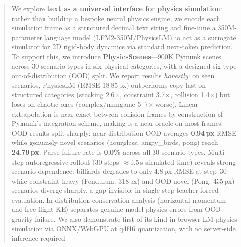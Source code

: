 \documentclass{article}
\begin{document}

\printAffiliationsAndNotice{}

\begin{abstract}
We explore \textbf{text as a universal interface for physics simulation}:
rather than building a bespoke neural physics engine, we encode each simulation
frame as a structured decimal text string and fine-tune a 350M-parameter language
model (LFM2-350M/PhysicsLM) to act as a surrogate simulator for 2D rigid-body
dynamics via standard next-token prediction.
To support this, we introduce \textbf{PhysicsScenes}---900K Pymunk scenes across
30 scenario types in six physical categories, with a designed six-type
out-of-distribution (OOD) split.
We report results \emph{honestly}: on seen scenarios, PhysicsLM (RMSE 18.85\,px)
outperforms copy-last on structured categories (stacking 2.6$\times$, constraint 3.7$\times$,
collision 1.4$\times$) but loses on chaotic ones (complex/minigame 5--7$\times$ worse).
Linear extrapolation is near-exact between collision frames by construction
of Pymunk's integration scheme, making it a near-oracle on most frames.
OOD results split sharply: near-distribution OOD averages \textbf{0.94\,px} RMSE
while genuinely novel scenarios (hourglass, angry\_birds, pong) reach \textbf{24.79\,px}.
Parse failure rate is \textbf{0.0\%} across all 30 scenario types.
Multi-step autoregressive rollout (30 steps $\approx$0.5\,s simulated time)
reveals strong scenario-dependence: billiards degrades to only 4.8\,px RMSE at
step~30 while constraint-heavy (Pendulum: 318\,px) and OOD-novel (Pong: 435\,px)
scenarios diverge sharply, a gap invisible in single-step teacher-forced evaluation.
In-distribution conservation analysis (horizontal momentum and free-flight KE)
separates genuine model physics errors from OOD-gravity failure.
We also demonstrate first-of-its-kind in-browser LM physics simulation via ONNX/WebGPU
at q4f16 quantization, with no server-side inference required.
\end{abstract}
\end{document}
